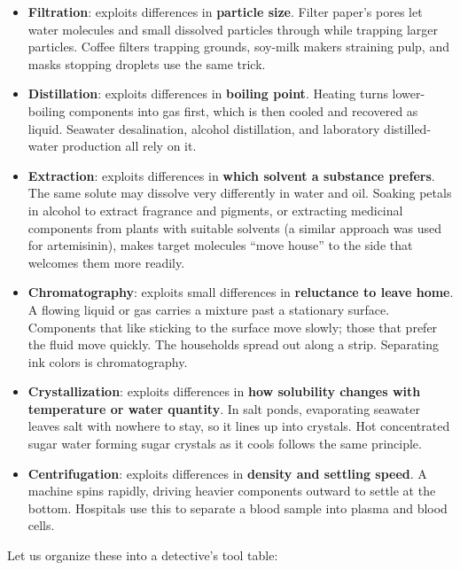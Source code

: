 \begin{itemize}[itemsep=2pt]
\item \textbf{Filtration}: exploits differences in \textbf{particle size}. Filter paper's pores let water molecules and small dissolved particles through while trapping larger particles. Coffee filters trapping grounds, soy-milk makers straining pulp, and masks stopping droplets use the same trick.
\item \textbf{Distillation}: exploits differences in \textbf{boiling point}. Heating turns lower-boiling components into gas first, which is then cooled and recovered as liquid. Seawater desalination, alcohol distillation, and laboratory distilled-water production all rely on it.
\item \textbf{Extraction}: exploits differences in \textbf{which solvent a substance prefers}. The same solute may dissolve very differently in water and oil. Soaking petals in alcohol to extract fragrance and pigments, or extracting medicinal components from plants with suitable solvents (a similar approach was used for artemisinin), makes target molecules ``move house'' to the side that welcomes them more readily.
\item \textbf{Chromatography}: exploits small differences in \textbf{reluctance to leave home}. A flowing liquid or gas carries a mixture past a stationary surface. Components that like sticking to the surface move slowly; those that prefer the fluid move quickly. The households spread out along a strip. Separating ink colors is chromatography.
\item \textbf{Crystallization}: exploits differences in \textbf{how solubility changes with temperature or water quantity}. In salt ponds, evaporating seawater leaves salt with nowhere to stay, so it lines up into crystals. Hot concentrated sugar water forming sugar crystals as it cools follows the same principle.
\item \textbf{Centrifugation}: exploits differences in \textbf{density and settling speed}. A machine spins rapidly, driving heavier components outward to settle at the bottom. Hospitals use this to separate a blood sample into plasma and blood cells.
\end{itemize}

Let us organize these into a detective's tool table:

